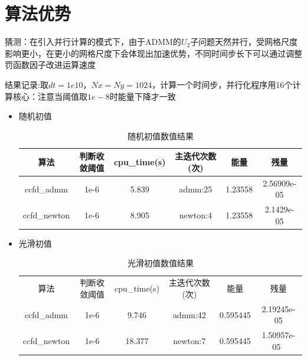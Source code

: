 \documentclass[11pt,a4 paper,one side]{article}
\begin{document}
\section{算法优势}
猜测：在引入并行计算的模式下，由于ADMM的$U_2$子问题天然并行，受网格尺度影响更小，在更小的网格尺度下会体现出加速优势，不同时间步长下可以通过调整罚函数因子改进运算速度
\par 结果记录:取$dt=1e10$，$Nx=Ny=1024$，计算一个时间步，并行化程序用16个计算核心：注意当阈值取$1e-8$时能量下降才一致
\begin{itemize}
\item 随机初值
\begin{table}
    \centering
    \begin{tabular}{c|c|c|c|c|c}
    算法&判断收敛阈值&cpu\_time(s)&主迭代次数(次)& 能量 &残量\\
    \hline
    ccfd\_admm & 1e-6 & 5.839 & admm:25 & 1.23558 & 2.56909e-05\\
    \hline
    ccfd\_newton & 1e-6 & 8.905 & newton:4 & 1.23558 & 2.1429e-05\\

    \end{tabular}
    \caption{随机初值数值结果}
    \label{随机初值数值结果}
\end{table}
\item 光滑初值
\begin{table}
    \centering
    \begin{tabular}{c|c|c|c|c|c}
    算法&判断收敛阈值&cpu\_time(s)&主迭代次数(次)& 能量 & 残量\\
    ccfd\_admm & 1e-6 & 9.746 & admm:42 & 0.595445 & 2.19245e-05\\
    \hline
    ccfd\_newton & 1e-6 & 18.377 & newton:7 & 0.595445 & 1.50957e-05\

    \end{tabular}
    \caption{光滑初值数值结果}
    \label{光滑初值数值结果}
\end{table}

\end{itemize}
\end{document}
